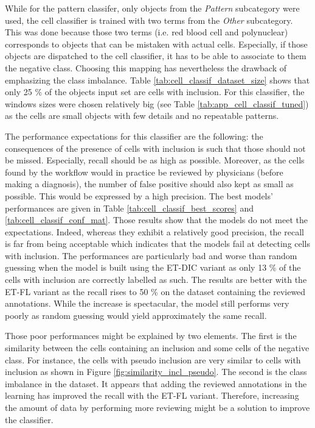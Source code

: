While for the pattern classifer, only objects from the \textit{Pattern} subcategory were used, the cell classifier is trained with two terms from the \textit{Other} subcategory. This was done because those two terms (i.e. red blood cell and polynuclear) corresponds to objects that can be mistaken with actual cells. Especially, if those objects are dispatched to the cell classifier, it has to be able to associate to them the negative class. Choosing this mapping has nevertheless the drawback of emphasizing the class imbalance. Table \ref{tab:cell_classif_dataset_size} shows that only 25 \% of the objects input set are cells with inclusion. For this classifier, the windows sizes were chosen relatively big (see Table \ref{tab:app_cell_classif_tuned}) as the cells are small objects with few details and no repeatable patterns. 

The performance expectations for this classifier are the following: the consequences of the presence of cells with inclusion is such that those should not be missed. Especially, recall should be as high as possible. Moreover, as the cells found by the workflow would in practice be reviewed by physicians (before making a diagnosis), the number of false positive should also kept as small as possible. This would be expressed by a high precision. The best models' performances are given in Table \ref{tab:cell_classif_best_scores} and \ref{tab:cell_classif_conf_mat}. Those results show that the models do not meet the expectations. Indeed, whereas they exhibit a relatively good precision, the recall is far from being acceptable which indicates that the models fail at detecting cells with inclusion. The performances are particularly bad and worse than random guessing when the model is built using the ET-DIC variant as only 13 \% of the cells with inclusion are correctly labelled as such. The results are better with the ET-FL variant as the recall rises to 50 \% on the dataset containing the reviewed annotations. While the increase is spectacular, the model still performs very poorly as random guessing would yield approximately the same recall. 

Those poor performances might be explained by two elements. The first is the similarity between the cells containing an inclusion and some cells of the negative class. For instance, the cells with pseudo inclusion are very similar to cells with inclusion as shown in Figure \ref{fig:similarity_incl_pseudo}. The second is the class imbalance in the dataset. It appears that adding the reviewed annotations in the learning has improved the recall with the ET-FL variant. Therefore, increasing the amount of data by performing more reviewing might be a solution to improve the classifier. 

